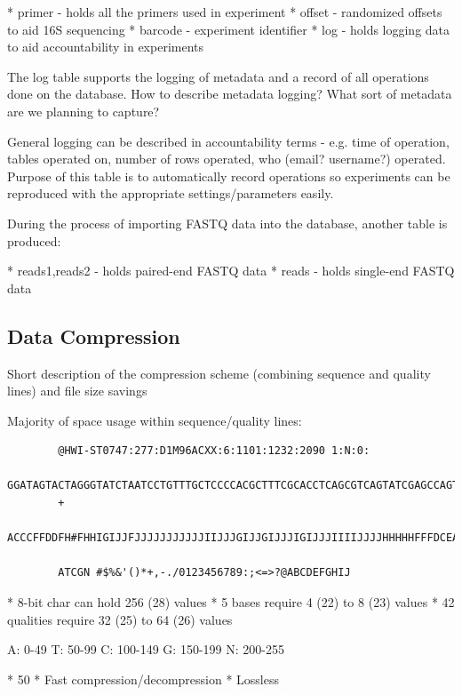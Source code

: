 \documentclass[12pt]{article}
\begin{document}
	* primer - holds all the primers used in experiment
	* offset - randomized offsets to aid 16S sequencing
	* barcode - experiment identifier
	* log - holds logging data to aid accountability in experiments
	
	The log table supports the logging of metadata and a record of all operations done on the database.
	How to describe metadata logging? What sort of metadata are we planning to capture?

	General logging can be described in accountability terms - e.g. time of operation, tables operated on,
	number of rows operated, who (email? username?) operated. Purpose of this table
	is to automatically record operations so experiments can be reproduced with the
	appropriate settings/parameters easily.

	During the process of importing FASTQ data into the database, another table is produced:

	* reads1,reads2 - holds paired-end FASTQ data
	* reads - holds single-end FASTQ data

	\subsection{Data Compression} %
	\label{sub:data_compression}
	Short description of the compression scheme (combining sequence and quality lines)
	and file size savings

	Majority of space usage within sequence/quality lines:
	\begin{verbatim}
		@HWI-ST0747:277:D1M96ACXX:6:1101:1232:2090 1:N:0:
		GGATAGTACTAGGGTATCTAATCCTGTTTGCTCCCCACGCTTTCGCACCTCAGCGTCAGTATCGAGCCAGTGAGCCGCCTTCGCCACTGGTGTTCCTCCGAATATCTACGAATTTCACTGCTACACGCGGAATTCCATCCCCCTCTACCGT
		+
		ACCCFFDDFH#FHHIGIJJFJJJJJJJJJJJIIJJJGIJJGIJJJIGIJJJIIIIJJJJHHHHHFFFDCEACCDDCDDD@BDDDDBDDDDDDDDDDDDDBBB@BDEEACDDDDDDDEDDCCDDDADBBDDDDDDDDECCBDDDB@9@AA<<
		
		ATCGN #$%&'()*+,-./0123456789:;<=>?@ABCDEFGHIJ
	\end{verbatim}




	* 8-bit char can hold 256 (28) values
	* 5 bases require 4 (22) to 8 (23) values
	* 42 qualities require 32 (25) to 64 (26) values

	A: 0-49
	T: 50-99
	C: 100-149
	G: 150-199
	N: 200-255

	* 50%
	* Fast compression/decompression
	* Lossless
	
\end{document}
